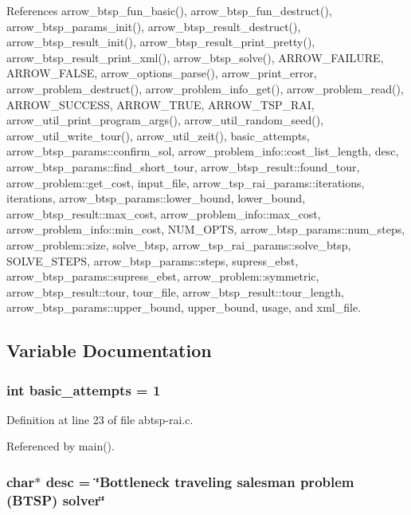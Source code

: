 References arrow\_\-btsp\_\-fun\_\-basic(), arrow\_\-btsp\_\-fun\_\-destruct(), arrow\_\-btsp\_\-params\_\-init(), arrow\_\-btsp\_\-result\_\-destruct(), arrow\_\-btsp\_\-result\_\-init(), arrow\_\-btsp\_\-result\_\-print\_\-pretty(), arrow\_\-btsp\_\-result\_\-print\_\-xml(), arrow\_\-btsp\_\-solve(), ARROW\_\-FAILURE, ARROW\_\-FALSE, arrow\_\-options\_\-parse(), arrow\_\-print\_\-error, arrow\_\-problem\_\-destruct(), arrow\_\-problem\_\-info\_\-get(), arrow\_\-problem\_\-read(), ARROW\_\-SUCCESS, ARROW\_\-TRUE, ARROW\_\-TSP\_\-RAI, arrow\_\-util\_\-print\_\-program\_\-args(), arrow\_\-util\_\-random\_\-seed(), arrow\_\-util\_\-write\_\-tour(), arrow\_\-util\_\-zeit(), basic\_\-attempts, arrow\_\-btsp\_\-params::confirm\_\-sol, arrow\_\-problem\_\-info::cost\_\-list\_\-length, desc, arrow\_\-btsp\_\-params::find\_\-short\_\-tour, arrow\_\-btsp\_\-result::found\_\-tour, arrow\_\-problem::get\_\-cost, input\_\-file, arrow\_\-tsp\_\-rai\_\-params::iterations, iterations, arrow\_\-btsp\_\-params::lower\_\-bound, lower\_\-bound, arrow\_\-btsp\_\-result::max\_\-cost, arrow\_\-problem\_\-info::max\_\-cost, arrow\_\-problem\_\-info::min\_\-cost, NUM\_\-OPTS, arrow\_\-btsp\_\-params::num\_\-steps, arrow\_\-problem::size, solve\_\-btsp, arrow\_\-tsp\_\-rai\_\-params::solve\_\-btsp, SOLVE\_\-STEPS, arrow\_\-btsp\_\-params::steps, supress\_\-ebst, arrow\_\-btsp\_\-params::supress\_\-ebst, arrow\_\-problem::symmetric, arrow\_\-btsp\_\-result::tour, tour\_\-file, arrow\_\-btsp\_\-result::tour\_\-length, arrow\_\-btsp\_\-params::upper\_\-bound, upper\_\-bound, usage, and xml\_\-file.

\subsection{Variable Documentation}
\hypertarget{abtsp-rai_8c_227b7ec968925f365b96a92ace419c56}{
\subsubsection[{basic\_\-attempts}]{\setlength{\rightskip}{0pt plus 5cm}int {\bf basic\_\-attempts} = 1}}
\label{abtsp-rai_8c_227b7ec968925f365b96a92ace419c56}




Definition at line 23 of file abtsp-rai.c.

Referenced by main().\hypertarget{abtsp-rai_8c_3aad16fd4bea1b9717f232ea75ad6449}{
\subsubsection[{desc}]{\setlength{\rightskip}{0pt plus 5cm}char$\ast$ {\bf desc} = \char`\"{}Bottleneck traveling salesman problem (BTSP) solver\char`\"{}}}
\label{abtsp-rai_8c_3aad16fd4bea1b9717f232ea75ad6449}




